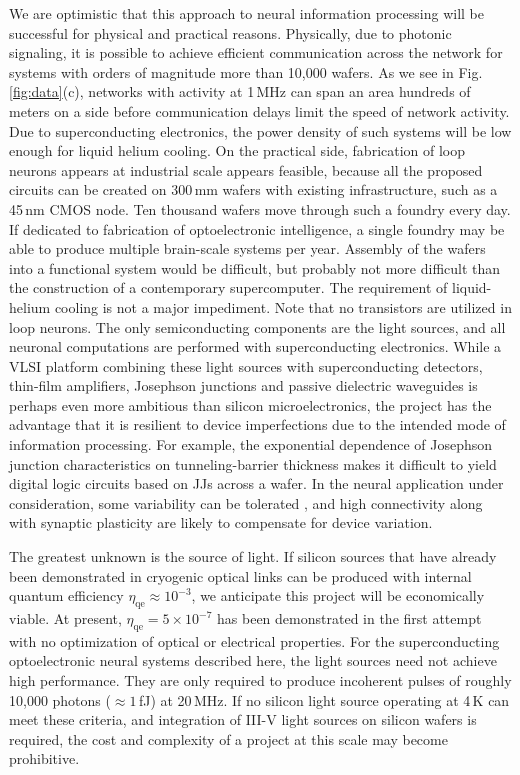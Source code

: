 \documentclass[twocolumn]{article}
\begin{document}
We are optimistic that this approach to neural information processing will be successful for physical and practical reasons. Physically, due to photonic signaling, it is possible to achieve efficient communication across the network for systems with orders of magnitude more than 10,000 wafers. As we see in Fig.\,\ref{fig:data}(c), networks with activity at 1\,MHz can span an area hundreds of meters on a side before communication delays limit the speed of network activity. Due to superconducting electronics, the power density of such systems will be low enough for liquid helium cooling. On the practical side, fabrication of loop neurons appears at industrial scale appears feasible, because all the proposed circuits can be created on 300\,mm wafers with existing infrastructure, such as a 45\,nm CMOS node. Ten thousand wafers move through such a foundry every day. If dedicated to fabrication of optoelectronic intelligence, a single foundry may be able to produce multiple brain-scale systems per year. Assembly of the wafers into a functional system would be difficult, but probably not more difficult than the construction of a contemporary supercomputer. The requirement of liquid-helium cooling is not a major impediment. Note that no transistors are utilized in loop neurons. The only semiconducting components are the light sources, and all neuronal computations are performed with superconducting electronics. While a VLSI platform combining these light sources with superconducting detectors, thin-film amplifiers, Josephson junctions and passive dielectric waveguides is perhaps even more ambitious than silicon microelectronics, the project has the advantage that it is resilient to device imperfections due to the intended mode of information processing. For example, the exponential dependence of Josephson junction characteristics on tunneling-barrier thickness makes it difficult to yield digital logic circuits based on JJs across a wafer. In the neural application under consideration, some variability can be tolerated \cite{stro2005}, and high connectivity along with synaptic plasticity are likely to compensate for device variation.

The greatest unknown is the source of light. If silicon sources that have already been demonstrated in cryogenic optical links \cite{buch2017} can be produced with internal quantum efficiency $\eta_{\mathrm{qe}}\approx 10^{-3}$, we anticipate this project will be economically viable. At present, $\eta_{\mathrm{qe}} = 5\times10^{-7}$ has been demonstrated in the first attempt with no optimization of optical or electrical properties. For the superconducting optoelectronic neural systems described here, the light sources need not achieve high performance. They are only required to produce incoherent pulses of roughly 10,000 photons ($\approx 1$\,fJ) at 20\,MHz. If no silicon light source operating at 4\,K can meet these criteria, and integration of III-V light sources on silicon wafers is required, the cost and complexity of a project at this scale may become prohibitive.
\end{document}
